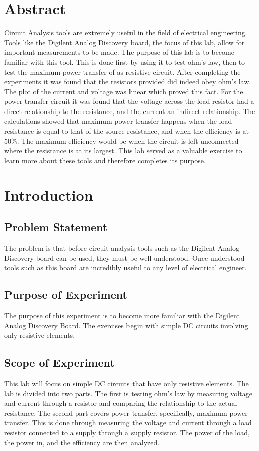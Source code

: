 \documentclass{article}
\begin{document}
  \section{Abstract}
\label{sec:Abstract}
Circuit Analysis tools are extremely useful in the field of electrical engineering.
Tools like the Digilent Analog Discovery board, the focus of this lab, allow for important
measurements to be made. The purpose of this lab is to become familiar with this tool. This
is done first by using it to test ohm's law, then to test the maximum power transfer of
as resistive circuit. After completing the experiments it was found that the resistors
provided did indeed obey ohm's law. The plot of the current and voltage was linear which
proved this fact. For the power transfer circuit it was found that the voltage across
the load resistor had a direct relationship to the resistance, and the current an indirect
relationship. The calculations showed that maximum power transfer happens when the
load resistance is equal to that of the source resistance, and when the efficiency is at 50\%.
The maximum efficiency would be when the circuit is left unconnected where the resistance is
at its largest. This lab served as a valuable exercise to learn more about these tools and
therefore completes its purpose.


\section{Introduction}
\label{sec:Introduction}

\subsection{Problem Statement}
\label{sub:Problem Statement}
The problem is that before circuit analysis tools such as the Digilent Analog Discovery
board can be used, they must be well understood. Once understood tools such as this board are incredibly
useful to any level of electrical engineer.

\subsection{Purpose of Experiment}
\label{sub:Purpose of Experiment}
The purpose of this experiment is to become more familiar with the Digilent Analog Discovery Board.
The exercises begin with simple DC circuits involving only resistive elements.

\subsection{Scope of Experiment}
\label{sub:Scope of Experiment}
This lab will focus on simple DC circuits that have only resistive elements. The lab
is divided into two parts. The first is testing ohm's law by measuring voltage and
current through a resistor and comparing the relationship to the actual resistance.
The second part covers power transfer, specifically, maximum power transfer. This is done
through measuring the voltage and current through a load resistor connected to a supply
through a supply resistor. The power of the load, the power in, and the efficiency are
then analyzed.
  \clearpage
\end{document}
